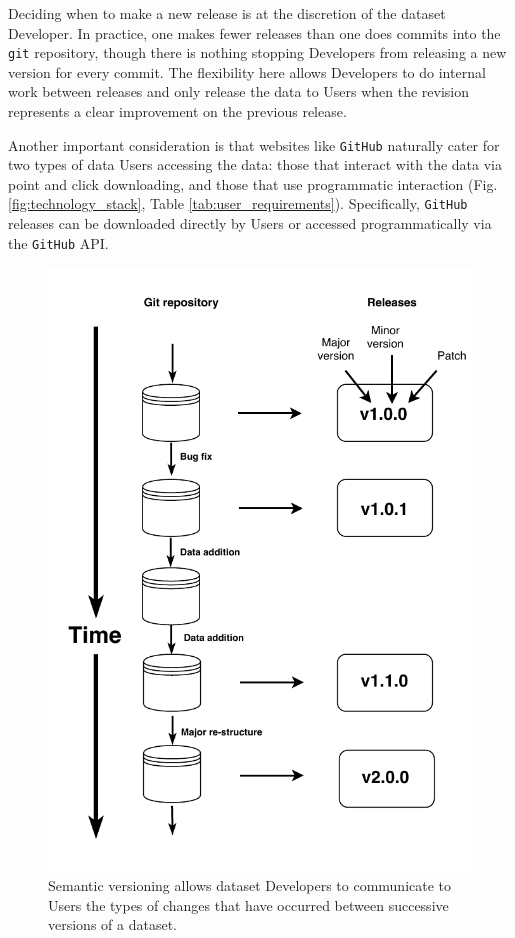 \documentclass[a4paper,num-refs]{assets/oup-contemporary}
\begin{document}
Deciding when to make a new release is at the discretion of the dataset Developer. In practice, one makes fewer releases than one does commits into the \texttt{git} repository, though there is nothing stopping Developers from releasing a new version for every commit. The flexibility here allows Developers to do internal work between releases and only release the data to Users when the revision represents a clear improvement on the previous release.

Another important consideration is that websites like \texttt{GitHub} naturally cater for two types of data Users accessing the data: those that interact with the data via point and click downloading, and those that use programmatic interaction (Fig. \ref{fig:technology_stack}, Table \ref{tab:user_requirements}). Specifically, \texttt{GitHub} releases can be downloaded directly by Users or accessed programmatically via the \texttt{GitHub} API.

\begin{figure}[!t]
\centering
\includegraphics[width=\linewidth]{figures/Figure-versions.pdf}
\caption{
Semantic versioning allows dataset Developers to communicate to Users the types of changes that have occurred between successive versions of a dataset.}
\label{fig:semantic}
\end{figure}
\end{document}

